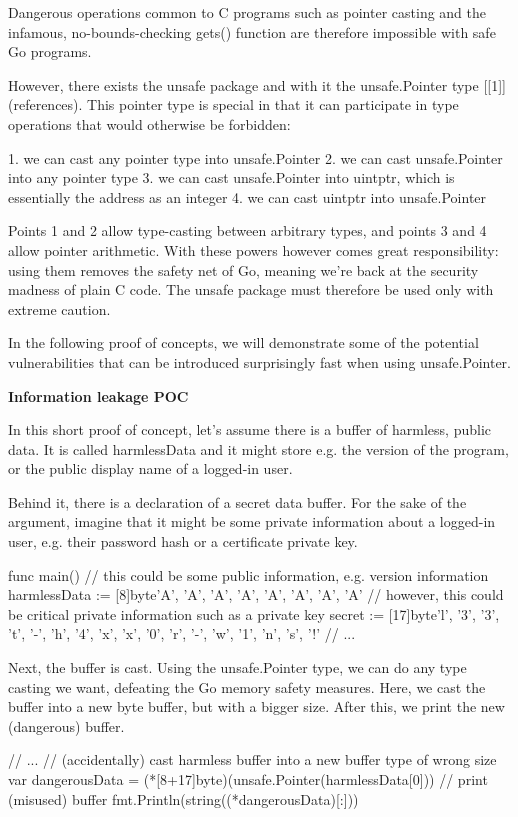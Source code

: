 Dangerous operations common to C programs such as pointer casting and the infamous, no-bounds-checking gets() function
are therefore impossible with safe Go programs.

However, there exists the unsafe package and with it the unsafe.Pointer type [[1]](references). This pointer type 
is special in that it can participate in type operations that would otherwise be forbidden:

 1. we can cast any pointer type into unsafe.Pointer
 2. we can cast unsafe.Pointer into any pointer type
 3. we can cast unsafe.Pointer into uintptr, which is essentially the address as an integer
 4. we can cast uintptr into unsafe.Pointer
 
Points 1 and 2 allow type-casting between arbitrary types, and points 3 and 4 allow pointer arithmetic. With these
powers however comes great responsibility: using them removes the safety net of Go, meaning we're back at the security
madness of plain C code. The unsafe package must therefore be used only with extreme caution.

In the following proof of concepts, we will demonstrate some of the potential vulnerabilities that can be introduced
surprisingly fast when using unsafe.Pointer.


\textbf{Information leakage POC}

In this short proof of concept, let's assume there is a buffer of harmless, public data. It is called harmlessData
and it might store e.g. the version of the program, or the public display name of a logged-in user.

Behind it, there is a declaration of a secret data buffer. For the sake of the argument, imagine that it might be some
private information about a logged-in user, e.g. their password hash or a certificate private key.

func main() 
    // this could be some public information, e.g. version information
    harmlessData := [8]byte'A', 'A', 'A', 'A', 'A', 'A', 'A', 'A'
    // however, this could be critical private information such as a private key
    secret := [17]byte'l', '3', '3', 't', '-', 'h', '4', 'x', 'x', '0', 'r', '-', 'w', '1', 'n', 's', '!'
    // ...


Next, the buffer is cast. Using the unsafe.Pointer type, we can do any type casting we want, defeating the Go memory
safety measures. Here, we cast the buffer into a new byte buffer, but with a bigger size. After this, we print the new
(dangerous) buffer.

    // ...
    // (accidentally) cast harmless buffer into a new buffer type of wrong size
    var dangerousData = (*[8+17]byte)(unsafe.Pointer(harmlessData[0]))
    // print (misused) buffer
    fmt.Println(string((*dangerousData)[:]))


